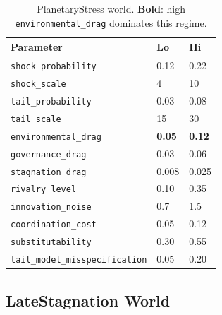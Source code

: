\begin{table}[ht]
\centering
\small
\begin{tabularx}{\linewidth}{Xll}
\toprule
\textbf{Parameter} & \textbf{Lo} & \textbf{Hi} \\
\midrule
\texttt{shock\_probability} & 0.12 & 0.22 \\
\texttt{shock\_scale} & 4 & 10 \\
\texttt{tail\_probability} & 0.03 & 0.08 \\
\texttt{tail\_scale} & 15 & 30 \\
\texttt{environmental\_drag} & \textbf{0.05} & \textbf{0.12} \\
\texttt{governance\_drag} & 0.03 & 0.06 \\
\texttt{stagnation\_drag} & 0.008 & 0.025 \\
\texttt{rivalry\_level} & 0.10 & 0.35 \\
\texttt{innovation\_noise} & 0.7 & 1.5 \\
\texttt{coordination\_cost} & 0.05 & 0.12 \\
\texttt{substitutability} & 0.30 & 0.55 \\
\texttt{tail\_model\_misspecification} & 0.05 & 0.20 \\
\bottomrule
\end{tabularx}
\caption[PlanetaryStress world parameters]{PlanetaryStress world.
\textbf{Bold}: high \texttt{environmental\_drag} dominates this
regime.}
\label{tab:world-planetary}
\end{table}

\subsection{LateStagnation World}

